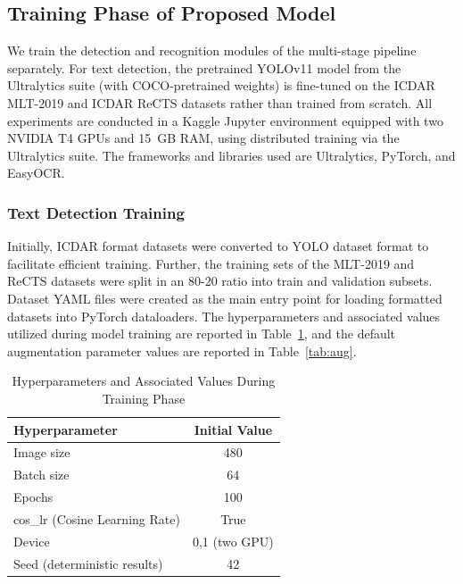 \documentclass{ieeeaccess}
\begin{document}
\subsection{Training Phase of Proposed Model}

We train the detection and recognition modules of the multi-stage pipeline separately. For text detection, the pretrained YOLOv11 model from the Ultralytics suite (with COCO-pretrained weights) is fine-tuned on the ICDAR MLT-2019 and ICDAR ReCTS datasets rather than trained from scratch. All experiments are conducted in a Kaggle Jupyter environment equipped with two NVIDIA T4 GPUs and 15~GB RAM, using distributed training via the Ultralytics suite. The frameworks and libraries used are Ultralytics, PyTorch, and EasyOCR.

\subsubsection{Text Detection Training}

Initially, ICDAR format datasets were converted to YOLO dataset format to
facilitate efficient training. Further, the training sets of the MLT-2019 and
ReCTS datasets were split in an 80-20 ratio into train and validation subsets.
Dataset YAML files were created as the main entry point for loading formatted
datasets into PyTorch dataloaders. The hyperparameters and associated values
utilized during model training are reported in Table~\ref{tab:hyper}, and the
default augmentation parameter values are reported in Table~\ref{tab:aug}.

\begin{table}[htbp]
\caption{Hyperparameters and Associated Values During Training Phase}
\label{tab:hyper}
\begin{center}
\begin{tabular}{|l|c|}
\hline
\textbf{Hyperparameter} & \textbf{Initial Value} \\
\hline
Image size & 480 \\
Batch size & 64 \\
Epochs & 100 \\
cos\_lr (Cosine Learning Rate) & True \\
Device & 0,1 (two GPU) \\
Seed (deterministic results) & 42 \\
\hline
\end{tabular}
\end{center}
\end{table}
\end{document}
